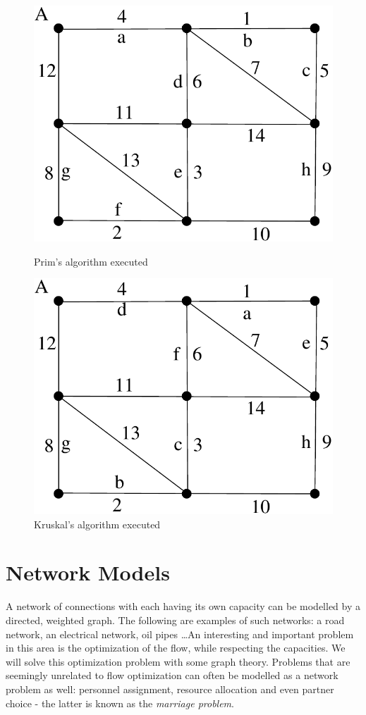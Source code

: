 \begin{figure}[h]
	\begin{minipage}{0.5\linewidth}
		\centering
		\includegraphics[width=0.7\linewidth,keepaspectratio]{prim1} %
		\caption{Prim's algorithm executed \label{prim1}}
	\end{minipage}
	\begin{minipage}{0.5\linewidth}
		\centering
		\includegraphics[width=0.7\linewidth,keepaspectratio]{kruskal1} %
		\caption{Kruskal's algorithm executed}\label{kruskal1}
	\end{minipage}
\end{figure}

\chapter{Network Models}

A network of connections with each having its own capacity can be modelled by
a directed, weighted graph. The following are examples of such
networks: a road network, an electrical network, oil pipes \ldots An
interesting and important problem in this area is the optimization
of the flow, while respecting the capacities. We will solve this
optimization problem with some graph theory. Problems that are
seemingly unrelated to flow optimization can often be modelled as a
network problem as well: personnel assignment, resource allocation and
even partner choice - the latter is known as the {\em marriage
  problem}.


